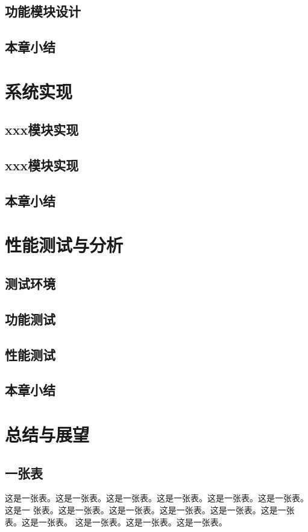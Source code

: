 \documentclass[supercite]{HustGraduPaper}
\theoremstyle{definition}
\begin{document}
\subsection{功能模块设计}
\subsection{本章小结}
\section{系统实现}
\subsection{xxx模块实现}
\subsection{xxx模块实现}
\subsection{本章小结}
\section{性能测试与分析}
\subsection{测试环境}
\subsection{功能测试}
\subsection{性能测试}
\subsection{本章小结}
\section{总结与展望}

\subsection{一张表}

这是一张表。这是一张表。这是一张表。这是一张表。这是一张表。这是一张表。这是一
张表。这是一张表。这是一张表。这是一张表。这是一张表。这是一张表。这是一张表。
这是一张表。这是一张表。这是一张表。
\end{document}
